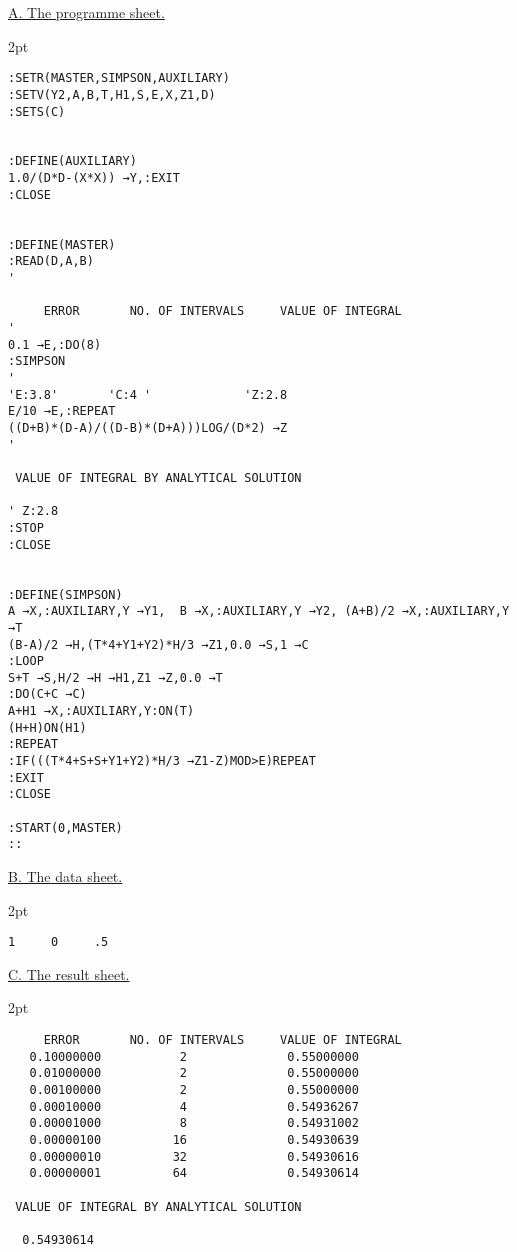 \documentclass[10pt, a4paper, oneside]{article}
\newcommand{\myuline}[1]{\uline{#1}}
\newcommand{\listingLeft}{1cm}
\newcommand{\listingRight}{2pt}
\begin{document}
\newpage


\begingroup
\centering

\setlength\FrameSep{2mm}

\myuline{A. The programme sheet.}

\setlength\FrameSep{2pt}
\begin{framed}
\begin{addmargin}[\listingLeft]{\listingRight}
\begin{lstlisting}
:SETR(MASTER,SIMPSON,AUXILIARY)
:SETV(Y2,A,B,T,H1,S,E,X,Z1,D)
:SETS(C)


:DEFINE(AUXILIARY)
1.0/(D*D-(X*X)) →Y,:EXIT
:CLOSE


:DEFINE(MASTER)
:READ(D,A,B)
'

     ERROR       NO. OF INTERVALS     VALUE OF INTEGRAL
'
0.1 →E,:DO(8)
:SIMPSON
'
'E:3.8'       'C:4 '             'Z:2.8
E/10 →E,:REPEAT
((D+B)*(D-A)/((D-B)*(D+A)))LOG/(D*2) →Z
'

 VALUE OF INTEGRAL BY ANALYTICAL SOLUTION

' Z:2.8
:STOP
:CLOSE


:DEFINE(SIMPSON)
A →X,:AUXILIARY,Y →Y1,  B →X,:AUXILIARY,Y →Y2, (A+B)/2 →X,:AUXILIARY,Y →T
(B-A)/2 →H,(T*4+Y1+Y2)*H/3 →Z1,0.0 →S,1 →C
:LOOP
S+T →S,H/2 →H →H1,Z1 →Z,0.0 →T
:DO(C+C →C)
A+H1 →X,:AUXILIARY,Y:ON(T)
(H+H)ON(H1)
:REPEAT
:IF(((T*4+S+S+Y1+Y2)*H/3 →Z1-Z)MOD>E)REPEAT
:EXIT
:CLOSE

:START(0,MASTER)
::
\end{lstlisting}
\end{addmargin}
\end{framed}

\myuline{B. The data sheet.}

\begin{framed}
\begin{addmargin}[\listingLeft]{\listingRight}
\begin{lstlisting}
1     0     .5
\end{lstlisting}
\end{addmargin}
\end{framed}

\myuline{C. The result sheet.}

\begin{framed}
\begin{addmargin}[\listingLeft]{\listingRight}
\begin{lstlisting}
     ERROR       NO. OF INTERVALS     VALUE OF INTEGRAL
   0.10000000           2              0.55000000
   0.01000000           2              0.55000000
   0.00100000           2              0.55000000
   0.00010000           4              0.54936267
   0.00001000           8              0.54931002
   0.00000100          16              0.54930639
   0.00000010          32              0.54930616
   0.00000001          64              0.54930614

 VALUE OF INTEGRAL BY ANALYTICAL SOLUTION

  0.54930614
\end{lstlisting}
\end{addmargin}
\end{framed}
\end{document}
